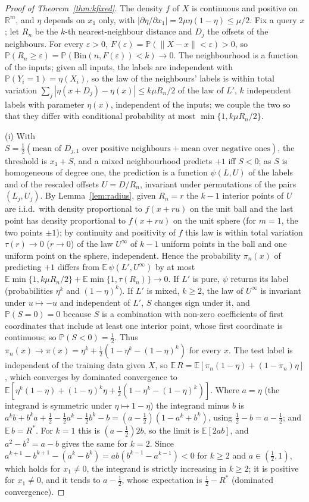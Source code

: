 \documentclass[11pt,a4paper]{article}
\theoremstyle{plain}
\theoremstyle{definition}
\theoremstyle{remark}
\newcommand{\R}{\mathbb{R}}
\newcommand{\E}{\mathbb{E}}
\newcommand{\Prob}{\mathbb{P}}
\newcommand{\Risk}{R}
\begin{document}
\begin{proof}[Proof of Theorem~\ref{thm:kfixed}]
The density $f$ of $X$ is continuous and positive on $\R^m$, and $\eta$ depends on $x_1$ only, with $|\partial\eta/\partial x_1|=2\mu\eta(1-\eta)\le\mu/2$. Fix a query $x$; let $R_n$ be the $k$-th nearest-neighbour distance and $D_j$ the offsets of the neighbours. For every $\varepsilon>0$, $F(\varepsilon)=\Prob(\|X-x\|<\varepsilon)>0$, so $\Prob(R_n\ge\varepsilon)=\Prob(\mathrm{Bin}(n,F(\varepsilon))<k)\to0$. The neighbourhood is a function of the inputs; given all inputs, the labels are independent with $\Prob(Y_i=1)=\eta(X_i)$, so the law of the neighbours' labels is within total variation $\sum_j|\eta(x+D_j)-\eta(x)|\le k\mu R_n/2$ of the law of $L'$, $k$ independent labels with parameter $\eta(x)$, independent of the inputs; we couple the two so that they differ with conditional probability at most $\min\{1,k\mu R_n/2\}$.

(i) With $S=\tfrac12(\text{mean of }D_{j,1}\text{ over positive neighbours}+\text{mean over negative ones})$, the threshold is $x_1+S$, and a mixed neighbourhood predicts $+1$ iff $S<0$; as $S$ is homogeneous of degree one, the prediction is a function $\psi(L,U)$ of the labels and of the rescaled offsets $U=D/R_n$, invariant under permutations of the pairs $(L_j,U_j)$. By Lemma~\ref{lem:radius}, given $R_n=r$ the $k-1$ interior points of $U$ are i.i.d.\ with density proportional to $f(x+ru)$ on the unit ball and the last point has density proportional to $f(x+ru)$ on the unit sphere (for $m=1$, the two points $\pm1$); by continuity and positivity of $f$ this law is within total variation $\tau(r)\to0$ ($r\to0$) of the law $U^\infty$ of $k-1$ uniform points in the ball and one uniform point on the sphere, independent. Hence the probability $\pi_n(x)$ of predicting $+1$ differs from $\E\,\psi(L',U^\infty)$ by at most $\E\min\{1,k\mu R_n/2\}+\E\min\{1,\tau(R_n)\}\to0$. If $L'$ is pure, $\psi$ returns its label (probabilities $\eta^k$ and $(1-\eta)^k$). If $L'$ is mixed, $k\ge2$, the law of $U^\infty$ is invariant under $u\mapsto-u$ and independent of $L'$, $S$ changes sign under it, and $\Prob(S=0)=0$ because $S$ is a combination with non-zero coefficients of first coordinates that include at least one interior point, whose first coordinate is continuous; so $\Prob(S<0)=\tfrac12$. Thus $\pi_n(x)\to\pi(x)=\eta^k+\tfrac12(1-\eta^k-(1-\eta)^k)$ for every $x$. The test label is independent of the training data given $X$, so $\E\,\Risk=\E[\pi_n(1-\eta)+(1-\pi_n)\eta]$, which converges by dominated convergence to $\E[\eta^k(1-\eta)+(1-\eta)^k\eta+\tfrac12(1-\eta^k-(1-\eta)^k)]$. Where $a=\eta$ (the integrand is symmetric under $\eta\mapsto1-\eta$) the integrand minus $b$ is $a^kb+b^ka+\tfrac12-\tfrac12a^k-\tfrac12b^k-b=(a-\tfrac12)(1-a^k+b^k)$, using $\tfrac12-b=a-\tfrac12$; and $\E\,b=\Risk^*$. For $k=1$ this is $(a-\tfrac12)2b$, so the limit is $\E[2ab]$, and $a^2-b^2=a-b$ gives the same for $k=2$. Since $a^{k+1}-b^{k+1}-(a^k-b^k)=ab(b^{k-1}-a^{k-1})<0$ for $k\ge2$ and $a\in(\tfrac12,1)$, which holds for $x_1\neq0$, the integrand is strictly increasing in $k\ge2$; it is positive for $x_1\ne0$, and it tends to $a-\tfrac12$, whose expectation is $\tfrac12-\Risk^*$ (dominated convergence).


\end{proof}
\end{document}
